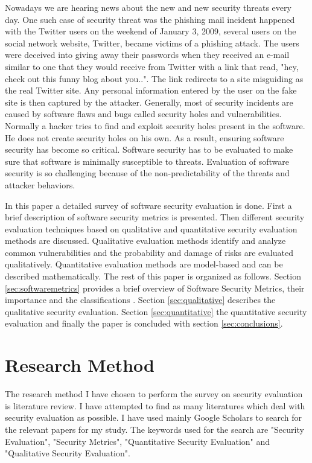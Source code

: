 \documentclass[pdftex,english,oribibl]{llncs}
\begin{document}
  Nowadays we are hearing news about the new and new security threats every day. One such case of security threat was the phishing mail incident happened with the Twitter users on the weekend of January 3, 2009, several users on the social network website, Twitter, became victims of a phishing attack. The users were deceived into giving away their passwords when they received an e-mail similar to one that they would receive from Twitter with a link that read, "hey, check out this funny blog about you..". The link redirects to a site misguiding as the real Twitter site. Any personal information entered by the user on the fake site is then captured by the attacker. Generally, most of security incidents are caused by software flaws and bugs called security holes and vulnerabilities. Normally a hacker tries to find and exploit security holes present in the software. He does not create security holes on his own. As a result, ensuring software security has become so critical. Software security has to be evaluated to make sure that software is minimally susceptible to threats. Evaluation of software security is so challenging because of the non-predictability of the threats and attacker behaviors. 

  In this paper a detailed survey of software security evaluation is done. First a brief description of software security metrics is presented. Then different security evaluation techniques based on qualitative and quantitative security evaluation methods are discussed. Qualitative evaluation methods identify and analyze common vulnerabilities and the probability and damage of risks are evaluated qualitatively. Quantitative evaluation methods are model-based and can be described mathematically. The rest of this paper is organized as follows. Section \ref{sec:softwaremetrics} provides a brief overview of Software Security Metrics, their importance and the classifications . Section \ref{sec:qualitative} describes the qualitative security evaluation. Section \ref{sec:quantitative} the quantitative security evaluation and finally the paper is concluded with section \ref{sec:conclusions}.

\section{Research Method}
The research method I have chosen to perform the survey on security evaluation is literature review. I have attempted to find as many literatures which deal with
security evaluation as possible. I have used mainly Google Scholars to search for the relevant papers for my study. The keywords used for the search are  "Security Evaluation", "Security Metrics", "Quantitative Security Evaluation" and  "Qualitative Security Evaluation".
\end{document}

